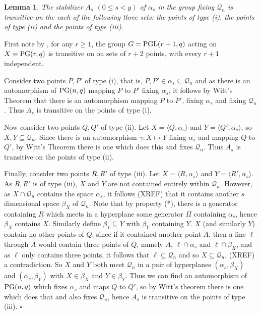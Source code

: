 \documentclass[12pt]{article}
\newtheorem{lemma}[theorem]{Lemma}
\newenvironment{proof}{\noindent{\bf Proof}\hspace{0.5em}}
    { \null  \hfill $\square$ \par}
\newcommand{\Q}{\mathscr Q}
\newcommand\PGL{{\rm PGL}}
\newcommand\PG{{\rm PG}}
\newcommand{\Label}{\label}
\newcommand\red[1]{{\color{red} #1}}
\begin{document}
\newpage
\begin{lemma}\Label{lem:three-orbs} The stabilizer $A_s$ $(0\le s <g)$  of $\alpha_s$ in the group fixing $\Q_n$ is transitive on the each of the following three sets: the points of type (i), the points of type (ii) and the points of type (iii).
\end{lemma}
\begin{proof}
First note by  \cite[Theorem 2.10]{ZxW}, for any $r\ge 1$, the group $G=\PGL(r+1,q)$ acting on $X=\PG(r,q)$ is transitive on on sets of $r+2$ points, with every $r+1$  independent.

Consider two points $P,P'$ of type (i), that is, $P,P'\in\alpha_s\subseteq\Q_n$ and as there is an automorphism of $\PG(n,q)$ mapping $P$ to $P'$ fixing $\alpha_s$, it follows by Witt's Theorem that there is an automorphism mapping $P$ to $P'$, fixing $\alpha_s$ and fixing $\Q_n$. Thus $A_s$ is transitive on the points of type (i).

Now consider two points $Q,Q'$ of type (ii). Let $X=\langle Q,\alpha_s\rangle$ and $Y=\langle Q',\alpha_s\rangle$, so $X,Y\subseteq \Q_n$. Since there is an automorphism $\gamma\colon X\mapsto Y$ fixing $\alpha_s$ and mapping $Q$ to  $Q'$, by Witt's Theorem there is one which does this and fixes $\Q_n$. Thus $A_s$ is transitive on the points of type (ii).

Finally, consider two points $R,R'$ of type (iii). Let $X=\langle R,\alpha_s\rangle$ and $Y=\langle R',\alpha_s\rangle$.  As $R,R'$ is of type (iii), $X$ and $Y$ are not contained entirely within $\Q_n$. However, as $X\cap\Q_n$ contains the space $\alpha_s$, it follows \red{ (XREF)} that it contains another $s$ dimensional space $\beta_X$ of $\Q_n$.  Note that by property (*), there is a generator containing $R$ which meets in a hyperplane some generator $\Pi$ containing $\alpha_s$, hence $\beta_X$ contains $X$.  Similarly define $\beta_Y\subseteq Y$ with $\beta_Y$ containing $Y$. $X$ (and similarly $Y$) contain no other points of $Q$, since if it contained another point $A$, then a line $\ell$ through $A$ would contain three points of $Q$, namely $A$, $\ell\cap\alpha_s$ and $\ell\cap\beta_X$, and as $\ell$ only contains three points, it follows that $\ell\subseteq\Q_n$ and so $X\subseteq\Q_n$,\red{ (XREF)} a contradiction.  So $X$ and $Y$ both meet $\Q_n$ in a pair of hyperplanes $(\alpha_s,\beta_X)$ and $(\alpha_s,\beta_Y)$ with $X\in\beta_X$ and $Y\in\beta_Y$. Thus we can find an automorphism of $\PG(n,q)$ which fixes $\alpha_s$ and maps $Q$ to $Q'$, so by Witt's theorem there is one which does that and also fixes $\Q_n$, hence $A_s$ is transitive on the points of type (iii).
\end{proof}
\end{document}

